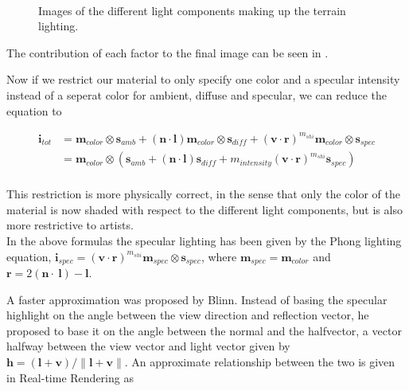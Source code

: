 
\begin{figure}
  \label{fig:lightComponents}
  \centering
  \\
  \caption{Images of the different light components making up the
    terrain lighting.}
\end{figure}


The contribution of each factor to the final image can be seen in
.

Now if we restrict our material to only specify one color and a
specular intensity instead of a seperat color for ambient, diffuse and
specular, we can reduce the equation to

\begin{displaymath}
  \begin{array}{rl}
    \mathbf{i}_{tot} &= \mathbf{m}_{color} \otimes \mathbf{s}_{amb} + (\mathbf{n} \cdot
    \mathbf{l}) \mathbf{m}_{color} \otimes \mathbf{s}_{diff} +
    (\mathbf{v} \cdot \mathbf{r})^{m_{shi}} \mathbf{m}_{color} \otimes
    \mathbf{s}_{spec} \\
    &= \mathbf{m}_{color} \otimes (\mathbf{s}_{amb} + (\mathbf{n} \cdot
    \mathbf{l}) \mathbf{s}_{diff} + m_{intensity} (\mathbf{v} \cdot
    \mathbf{r})^{m_{shi}} \mathbf{s}_{spec}) \\
  \end{array}
\end{displaymath}

This restriction is more physically correct, in the sense that only
the color of the material is now shaded with respect to the different
light components, but is also more restrictive to artists.\\


In the above formulas the specular lighting has been given by the
Phong lighting equation, $\mathbf{i}_{spec} = (\mathbf{v} \cdot
\mathbf{r})^{m_{shi}} \mathbf{m}_{spec} \otimes \mathbf{s}_{spec}$,
where $\mathbf{m}_{spec} = \mathbf{m}_{color}$ and $\mathbf{r} = 2
(\mathbf{n} \cdot \ \mathbf{l}) - \mathbf{l}$.

A faster approximation was proposed by Blinn. Instead of basing the
specular highlight on the angle between the view direction and
reflection vector, he proposed to base it on the angle between the
normal and the halfvector, a vector halfway between the view vector
and light vector given by $\mathbf{h} = (\mathbf{l} + \mathbf{v}) /
\|\mathbf{l} + \mathbf{v}\|$. An approximate relationship between the
two is given in Real-time Rendering as

